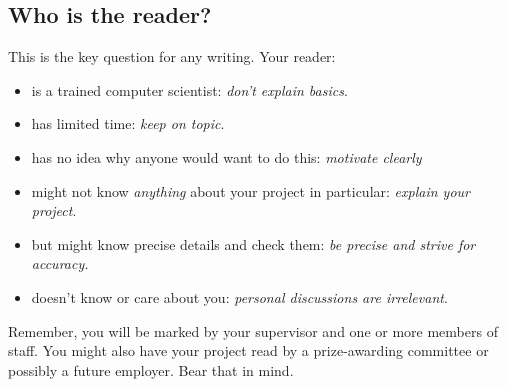 \documentclass{l4proj}
\begin{document}
\subsection{Who is the reader?}

This is the key question for any writing. Your reader:

\begin{itemize}
    \item
    is a trained computer scientist: \emph{don't explain basics}.
    \item
    has limited time: \emph{keep on topic}.
    \item
    has no idea why anyone would want to do this: \emph{motivate clearly}
    \item
    might not know \emph{anything} about your project in particular:
    \emph{explain your project}.
    \item
    but might know precise details and check them: \emph{be precise and
    strive for accuracy.}
    \item
    doesn't know or care about you: \emph{personal discussions are
    irrelevant}.
\end{itemize}

Remember, you will be marked by your supervisor and one or more members
of staff. You might also have your project read by a prize-awarding
committee or possibly a future employer. Bear that in mind.


\end{document}
